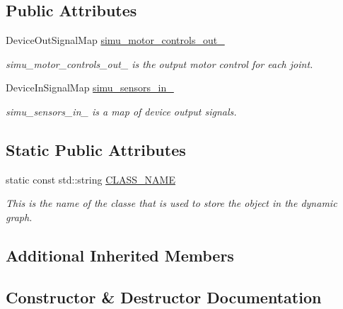 \subsection*{Public Attributes}
\begin{DoxyCompactItemize}
\item 
Device\+Out\+Signal\+Map \hyperlink{classdynamic__graph_1_1DeviceSimulator_abbbcc26f173788b15a395ff87f3925e1}{simu\+\_\+motor\+\_\+controls\+\_\+out\+\_\+}
\begin{DoxyCompactList}\small\item\em simu\+\_\+motor\+\_\+controls\+\_\+out\+\_\+ is the output motor control for each joint. \end{DoxyCompactList}\item 
Device\+In\+Signal\+Map \hyperlink{classdynamic__graph_1_1DeviceSimulator_a8640ee078f06fc5f31efcb2b35c9ed99}{simu\+\_\+sensors\+\_\+in\+\_\+}
\begin{DoxyCompactList}\small\item\em simu\+\_\+sensors\+\_\+in\+\_\+ is a map of device output signals. \end{DoxyCompactList}\end{DoxyCompactItemize}
\subsection*{Static Public Attributes}
\begin{DoxyCompactItemize}
\item 
static const std\+::string \hyperlink{classdynamic__graph_1_1DeviceSimulator_a4f28a1f4a96bdf5a2adf1e1f15a8ab77}{C\+L\+A\+S\+S\+\_\+\+N\+A\+ME}\hypertarget{classdynamic__graph_1_1DeviceSimulator_a4f28a1f4a96bdf5a2adf1e1f15a8ab77}{}\label{classdynamic__graph_1_1DeviceSimulator_a4f28a1f4a96bdf5a2adf1e1f15a8ab77}

\begin{DoxyCompactList}\small\item\em This is the name of the classe that is used to store the object in the dynamic graph. \end{DoxyCompactList}\end{DoxyCompactItemize}
\subsection*{Additional Inherited Members}


\subsection{Constructor \& Destructor Documentation}
